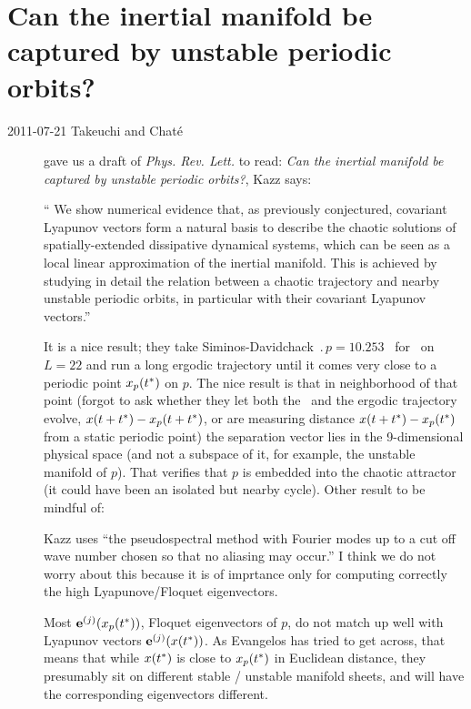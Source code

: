 \RemarksEnd

\section{Can the inertial manifold be captured by unstable periodic orbits?}
\label{sec:TaCh11}

\begin{description}

\item[2011-07-21 Takeuchi and Chat\'e]
gave us a draft of \emph{Phys. Rev. Lett.} to read:
\emph{Can the inertial manifold be captured by unstable periodic orbits?},
Kazz says:

`` We show numerical evidence that, as previously conjectured,
covariant Lyapunov vectors form a natural basis to describe the
chaotic solutions of spatially-extended dissipative dynamical
systems, which can be seen as a local linear approximation of the
inertial manifold. This is achieved by studying in detail the
relation between a chaotic trajectory and nearby unstable periodic
orbits, in particular with their covariant Lyapunov vectors.''

It is a nice result; they take Siminos-Davidchack $\period{p} = 10.253$
\po\ for \KS\ on $L = 22$ and run a long ergodic trajectory until it
comes very close to a periodic point $\ssp_p(t^*) $ on $p$. The nice
result is that in neighborhood of that point (forgot to ask whether they
let both the \po\ and the ergodic trajectory evolve, $\ssp(t+t^*) -
\ssp_p(t+t^*)$, or are measuring distance $\ssp(t+t^*) - \ssp_p(t^*)$ from a
static periodic point) the separation vector lies in the 9-dimensional
physical space (and not a subspace of it, for example, the unstable
manifold of $p$). That verifies that $p$ is embedded into the chaotic
attractor (it could have been an isolated but nearby cycle).
Other result to be mindful of:

Kazz uses ``the pseudospectral method with Fourier modes up to a cut off
wave number chosen so that no aliasing may occur.'' I think we do not
worry about this because it is of imprtance only for computing correctly
the high Lyapunove/Floquet eigenvectors.

Most $\jEigvec[j](\ssp_p(t^*))$, Floquet eigenvectors of $p$, do not match
up well with Lyapunov vectors $\jEigvec[j](\ssp(t^*))$. As Evangelos has
tried to get across, that means that while $\ssp(t^*)$ is close to
$\ssp_p(t^*) $ in Euclidean distance, they presumably sit on different
stable / unstable manifold sheets, and will have the corresponding
eigenvectors different.


\end{description}
